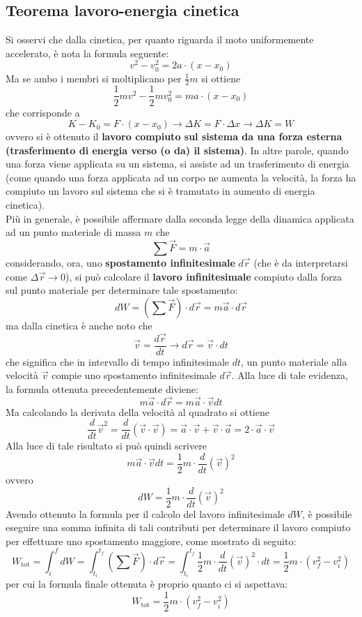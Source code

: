 \documentclass[a4paper]{extarticle}
\begin{document}
\vspace{1em}
\subsection{Teorema lavoro-energia cinetica}
Si osservi che dalla cinetica, per quanto riguarda il moto uniformemente accelerato, è nota la formula seguente:
\[v^2 - v_0^2 = 2a \cdot (x-x_0)\]
Ma se ambo i membri si moltiplicano per $\frac{1}{2}m$ si ottiene
\[\frac{1}{2} m v^2 - \frac{1}{2} m v_0^2 = ma \cdot (x-x_0)\]
che corrisponde a
\[K - K_0 = F \cdot (x-x_0) \longrightarrow \Delta K = F \cdot \Delta x \longrightarrow \Delta K = W\]
ovvero si è ottenuto il \textbf{lavoro compiuto sul sistema da una forza esterna (trasferimento di energia verso (o da) il sistema)}. In altre parole, quando una forza viene applicata su un sistema, si assiste ad un trasferimento di energia (come quando una forza applicata ad un corpo ne aumenta la velocità, la forza ha compiuto un lavoro sul sistema che si è tramutato in aumento di energia cinetica).\\
Più in generale, è possibile affermare dalla seconda legge della dinamica applicata ad un punto materiale di massa $m$ che
\[\sum \vec F = m \cdot \vec a\]
considerando, ora, uno \textbf{spostamento infinitesimale} $d \vec r$ (che è da interpretarsi come $\Delta \vec r \rightarrow 0$), si può calcolare il \textbf{lavoro infinitesimale} compiuto dalla forza sul punto materiale per determinare tale spostamento:
\[dW = \left(\sum \vec F\right) \cdot d \vec r = m \vec a \cdot d \vec r\]
ma dalla cinetica è anche noto che
\[\vec v = \frac{d \vec r}{d t} \longrightarrow d \vec r = \vec v \cdot dt\]
che significa che in intervallo di tempo infinitesimale $dt$, un punto materiale alla velocità $\vec v$ compie uno spostamento infinitesimale $d \vec r$. Alla luce di tale evidenza, la formula ottenuta precedentemente diviene:
\[m \vec a \cdot d \vec r = m \vec a \cdot \vec v dt\]
Ma calcolando la derivata della velocità al quadrato si ottiene
\[\frac{d}{dt} \vec v^2 = \frac{d}{dt} \left(\vec v \cdot \vec v\right) = \vec a \cdot \vec v + \vec v \cdot \vec a = 2 \cdot \vec a \cdot \vec v\]
Alla luce di tale risultato si può quindi scrivere
\[m \vec a \cdot \vec v dt = \frac{1}{2}m \cdot \frac{d}{dt} (\vec v)^2\]
ovvero
\[\boxed{dW = \frac{1}{2}m \cdot \frac{d}{dt} (\vec v)^2}\]
Avendo ottenuto la formula per il calcolo del lavoro infinitesimale $dW$, è possibile eseguire una somma infinita di tali contributi per determinare il lavoro compiuto per effettuare uno spostamento maggiore, come mostrato di seguito:
\[W_{\text{tot}} = \int_i^f dW = \int_{t_i}^{t_f} \left(\sum \vec F\right) \cdot d \vec{r} = \int_{t_i}^{t_f} \frac{1}{2}m \cdot \frac{d}{dt} (\vec v)^2 \cdot dt = \frac{1}{2}m \cdot \left(v_f^2 - v_i^2\right)\]
per cui la formula finale ottenuta è proprio quanto ci si aspettava:
\[\boxed{W_{\text{tot}} = \frac{1}{2}m \cdot \left(v_f^2 - v_i^2\right)}\]
\end{document}
